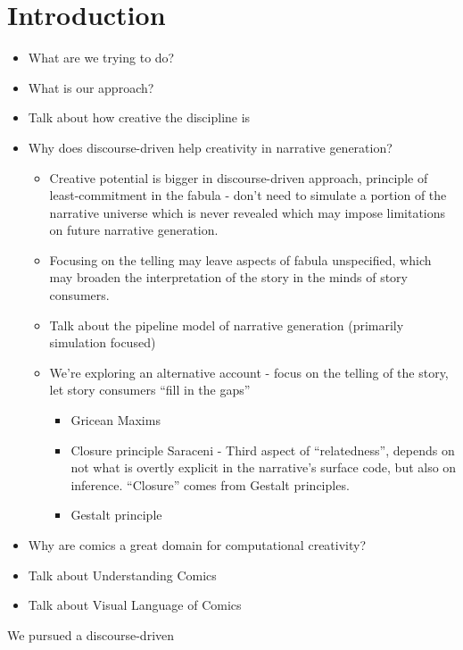 \section{Introduction}






\begin{itemize}

	\item What are we trying to do?
	\item What is our approach?
	\item Talk about how creative the discipline is
	\item Why does discourse-driven help creativity in narrative generation?
		\begin{itemize}
			\item Creative potential is bigger in discourse-driven approach, principle 
			of least-commitment in the fabula - don't need to simulate a portion of 
			the narrative universe which is never revealed which may impose limitations
			on future narrative generation. 
			
			\item Focusing on the telling may leave aspects of fabula unspecified, which 
			may broaden the interpretation of the story in the minds of story consumers. 
			\item Talk about the pipeline model of narrative generation (primarily
				simulation focused)
			\item We're exploring an alternative account - focus on the telling of the 
				story, let story consumers ``fill in the gaps''
		
			\begin{itemize}
				\item Gricean Maxims
				\item Closure principle Saraceni - Third aspect of ``relatedness'', 
				depends on not what is overtly explicit in the narrative's surface 
				code, but also on inference.  ``Closure'' comes from Gestalt principles.
				\item Gestalt principle 
			\end{itemize}	
		\end{itemize}
	\item Why are comics a great domain for computational creativity?
	
	\item Talk about Understanding Comics~\cite{mcCloud1993understanding}
	\item Talk about Visual Language of Comics~\cite{cohn2013visual}
\end{itemize}

We pursued a discourse-driven 

